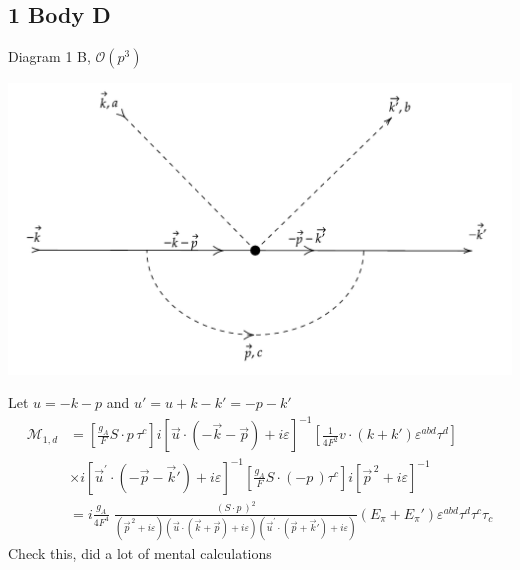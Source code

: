 \documentclass[11pt]{article}
\newcommand\ddfrac[2]{\frac{\displaystyle #1}{\displaystyle #2}}
\newcommand\mo{\mathcal{O}}
\newcommand\mm{\mathcal{M}}
\begin{document}
\subsection{1 Body D}
Diagram 1 B, $\mo(p^3)$
\begin{center}
    \includegraphics[scale=0.65]{1d.pdf}
\end{center}
Let $u=-k-p$ and $ u'=u+k-k'=-p-k'$
\begin{align}
    \mm_{1,d}&= \left[ \frac{g_A}{F} S \cdot p\, \tau^c  \right] i\left[\vec{u} \cdot \left( -\vec{k} - \vec{p} \right) +i \varepsilon  \right]^{-1} \left[\frac{1}{4 F^2} {v} \cdot \left( {k}+{k}' \right)\varepsilon^{abd} \tau^d \right]\nonumber \\
             &\times i \left[ \vec{u}^{\prime}\cdot \left( -\vec{p}-\vec{k}' \right) +i \varepsilon\right]^{-1}
             \left[ \frac{g_A}{F} {S}\cdot\left(-{p}\,\right)\tau^c\right]
             i[\vec{p}^{\,2} +i \varepsilon]^{-1}\\
             &=i\frac{g_A}{4 F^4} \; 
             \ddfrac{(S \cdot p\,)^2}{ \left( \vec{p}^{\,2} +i \varepsilon \right)  \left( \vec{u} \cdot \left(\vec{k} + \vec{p} \right) +i \varepsilon \right) \left( \vec{u}^{\prime}\cdot \left(\vec{p}+\vec{k}' \right) +i \varepsilon \right)}(E_\pi + E_\pi') \varepsilon^{abd} \tau^d\tau^c \tau_c  
\end{align}
Check this, did a lot of mental calculations
\newpage
\end{document}

